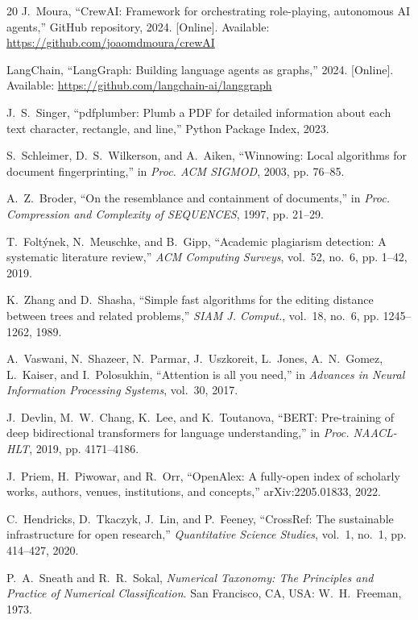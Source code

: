 \documentclass[conference]{IEEEtran}
\begin{document}
\begin{thebibliography}{20}
J.~Moura, ``CrewAI: Framework for orchestrating role-playing, autonomous AI agents,'' GitHub repository, 2024. [Online]. Available: \url{https://github.com/joaomdmoura/crewAI}

LangChain, ``LangGraph: Building language agents as graphs,'' 2024. [Online]. Available: \url{https://github.com/langchain-ai/langgraph}

J.~S.~Singer, ``pdfplumber: Plumb a PDF for detailed information about each text character, rectangle, and line,'' Python Package Index, 2023.

S.~Schleimer, D.~S.~Wilkerson, and A.~Aiken, ``Winnowing: Local algorithms for document fingerprinting,'' in \textit{Proc. ACM SIGMOD}, 2003, pp. 76--85.

A.~Z.~Broder, ``On the resemblance and containment of documents,'' in \textit{Proc. Compression and Complexity of SEQUENCES}, 1997, pp. 21--29.

T.~Folt\'ynek, N.~Meuschke, and B.~Gipp, ``Academic plagiarism detection: A systematic literature review,'' \textit{ACM Computing Surveys}, vol.~52, no.~6, pp. 1--42, 2019.

K.~Zhang and D.~Shasha, ``Simple fast algorithms for the editing distance between trees and related problems,'' \textit{SIAM J. Comput.}, vol.~18, no.~6, pp. 1245--1262, 1989.

A.~Vaswani, N.~Shazeer, N.~Parmar, J.~Uszkoreit, L.~Jones, A.~N.~Gomez, L.~Kaiser, and I.~Polosukhin, ``Attention is all you need,'' in \textit{Advances in Neural Information Processing Systems}, vol.~30, 2017.

J.~Devlin, M.~W.~Chang, K.~Lee, and K.~Toutanova, ``BERT: Pre-training of deep bidirectional transformers for language understanding,'' in \textit{Proc. NAACL-HLT}, 2019, pp. 4171--4186.

J.~Priem, H.~Piwowar, and R.~Orr, ``OpenAlex: A fully-open index of scholarly works, authors, venues, institutions, and concepts,'' arXiv:2205.01833, 2022.

C.~Hendricks, D.~Tkaczyk, J.~Lin, and P.~Feeney, ``CrossRef: The sustainable infrastructure for open research,'' \textit{Quantitative Science Studies}, vol.~1, no.~1, pp. 414--427, 2020.

P.~A.~Sneath and R.~R.~Sokal, \textit{Numerical Taxonomy: The Principles and Practice of Numerical Classification}. San Francisco, CA, USA: W.~H.~Freeman, 1973.
\end{thebibliography}
\end{document}

